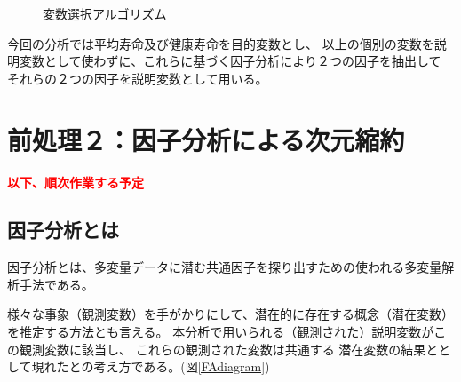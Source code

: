 \documentclass[a4j,11pt,mc]{jreport}
\newcommand{\tr}[1]{\textcolor{red}{\bf#1}} %
\begin{document}
 \begin{figure}
\centering
	\caption{変数選択アルゴリズム}
	\label{Varsel}
 \end{figure}





%
%
%
%
%
%
%



今回の分析では平均寿命及び健康寿命を目的変数とし、
以上の個別の変数を説明変数として使わずに、これらに基づく因子分析により２つの因子を抽出して
それらの２つの因子を説明変数として用いる。


\chapter{前処理２：因子分析による次元縮約}\label{chapter:FA}

\tr{以下、順次作業する予定}
%
%
%


\section{因子分析とは}

因子分析とは、多変量データに潜む共通因子を探り出すための使われる多変量解析手法である。
%





様々な事象（観測変数）を手がかりにして、潜在的に存在する概念（潜在変数）を推定する方法とも言える。
本分析で用いられる（観測された）説明変数がこの観測変数に該当し、
これらの観測された変数は共通する
潜在変数の結果ととして現れたとの考え方である。(図\ref{FAdiagram})
\end{document}
